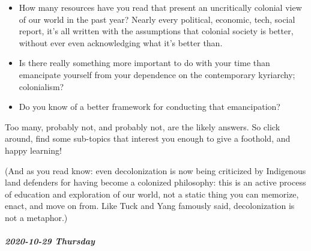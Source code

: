 \documentclass[11pt]{article}
\begin{document}
\begin{itemize}
\begin{itemize}
\item How many resources have you read that present an uncritically colonial view of our world in the past year? Nearly every political, economic, tech, social report, it’s all written with the assumptions that colonial society is better, without ever even acknowledging what it’s better than.

\item Is there really something more important to do with your time than emancipate yourself from your dependence on the contemporary kyriarchy; colonialism?

\item Do you know of a better framework for conducting that emancipation?
\end{itemize}

Too many, probably not, and probably not, are the likely answers. So click around, find some sub-topics that interest you enough to give a foothold, and happy learning!

(And as you read know: even decolonization is now being criticized by Indigenous land defenders for having become a colonized philosophy: this is an active process of education and exploration of our world, not a static thing you can memorize, enact, and move on from. Like Tuck and Yang famously said, decolonization is not a metaphor.)
\end{itemize}
\subparagraph*{2020-10-29 Thursday}
\label{sec:org384520f}
\end{document}
